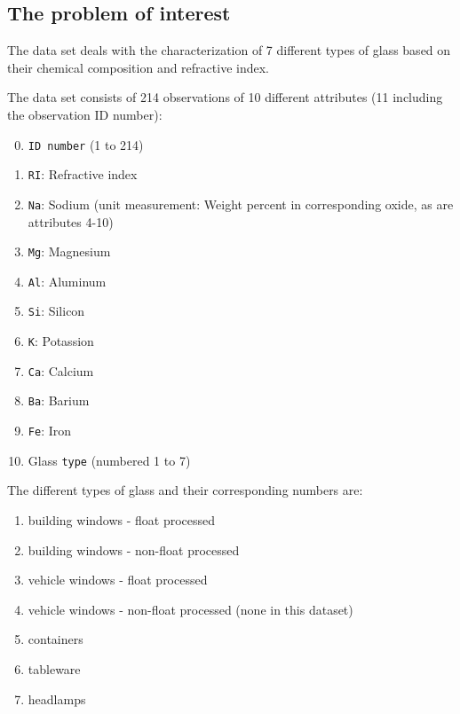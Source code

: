
\subsection{The problem of interest}\label{sec:problem_of_interest}
The data set deals with the characterization of 7 different types of glass based on their chemical composition and refractive index. 

The data set consists of 214 observations of 10 different attributes (11 including the observation ID number):

\begin{enumerate}
    
    \setcounter{enumi}{-1}
    \item \texttt{ID number} (1 to 214)
    \item \texttt{RI}: Refractive index
    \item \texttt{Na}: Sodium (unit measurement: Weight percent in corresponding oxide, as are attributes 4-10)
    \item \texttt{Mg}: Magnesium
    \item \texttt{Al}: Aluminum
    \item \texttt{Si}: Silicon
    \item \texttt{K}: Potassion
    \item \texttt{Ca}: Calcium
    \item \texttt{Ba}: Barium
    \item \texttt{Fe}: Iron
    \item Glass \texttt{type} (numbered 1 to 7)
\end{enumerate}

The different types of glass and their corresponding numbers are:

\begin{enumerate}
    \item building windows - float processed
    \item building windows - non-float processed
    \item vehicle windows - float processed
    \item vehicle windows - non-float processed (none in this dataset)
    \item containers
    \item tableware
    \item headlamps
\end{enumerate}

